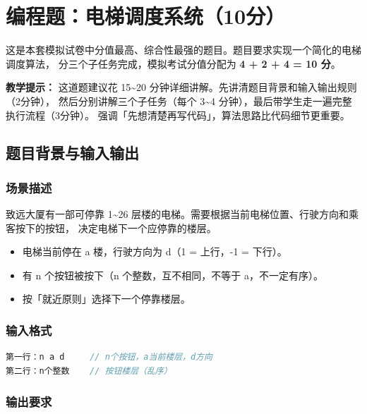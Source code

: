 \section{编程题：电梯调度系统（10分）}

这是本套模拟试卷中分值最高、综合性最强的题目。题目要求实现一个简化的电梯调度算法，
分三个子任务完成，模拟考试分值分配为 \textbf{4 + 2 + 4 = 10 分}。

\textbf{教学提示：} 这道题建议花 15\~{}20 分钟详细讲解。先讲清题目背景和输入输出规则（2分钟），
然后分别讲解三个子任务（每个 3\~{}4 分钟），最后带学生走一遍完整执行流程（3分钟）。
强调「先想清楚再写代码」，算法思路比代码细节更重要。

\bigskip

\subsection{题目背景与输入输出}

\subsubsection{场景描述}

致远大厦有一部可停靠 1\~{}26 层楼的电梯。需要根据当前电梯位置、行驶方向和乘客按下的按钮，
决定电梯下一个应停靠的楼层。

\begin{itemize}
    \item 电梯当前停在 a 楼，行驶方向为 d（1 = 上行，-1 = 下行）。
    \item 有 n 个按钮被按下（n 个整数，互不相同，不等于 a，不一定有序）。
    \item 按「就近原则」选择下一个停靠楼层。
\end{itemize}

\subsubsection{输入格式}

\begin{lstlisting}[language=C]
第一行：n a d     // n个按钮，a当前楼层，d方向
第二行：n个整数    // 按钮楼层（乱序）
\end{lstlisting}

\subsubsection{输出要求}

